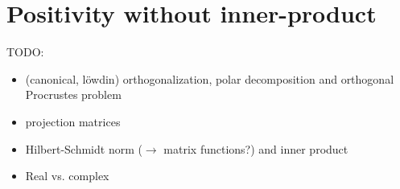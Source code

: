 \section{Positivity without inner-product}

TODO:
\begin{itemize}
	\item (canonical, löwdin) orthogonalization, polar decomposition and orthogonal Procrustes problem
	\item projection matrices
	\item Hilbert-Schmidt norm ($\to$ matrix functions?) and inner product
	\item Real vs. complex
\end{itemize}












